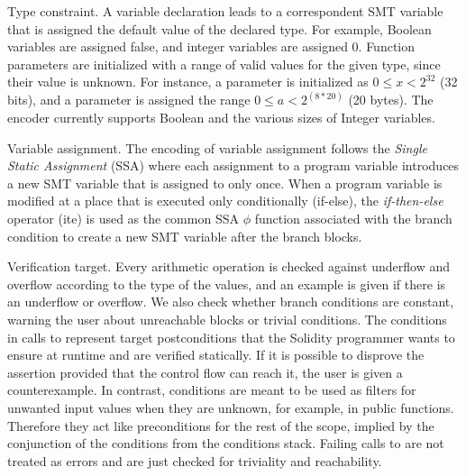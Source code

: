 \begin{paragraph}{Type constraint.}
A variable declaration leads to a correspondent SMT variable that is assigned
the default value of the declared type.
%
For example, Boolean variables are assigned false, and integer variables are
assigned 0.
%
Function parameters are initialized with a range of valid values for the given
type, since their value is unknown.  For instance, a parameter 
is initialized as $0 \le x < 2^{32}$ (32 bits), and a parameter  is assigned the range $0 \le a < 2^{(8*20)}$ (20 bytes).
%
The encoder currently supports Boolean and the various sizes of Integer
variables.

\end{paragraph}

\begin{paragraph}{Variable assignment.}
The encoding of variable assignment follows the \emph{Single Static Assignment}
(SSA) where each assignment to a program variable introduces a new SMT variable
that is assigned to only once.
%
When a program variable is modified at a place that is executed only
conditionally (if-else), the \emph{if-then-else} operator (ite) is used as the
common SSA $\phi$ function associated with the branch condition to create a new
SMT variable after the branch blocks.
\end{paragraph}

\begin{paragraph}{Verification target.}
Every arithmetic operation is checked against underflow and overflow according
to the type of the values, and an example is given if there is an underflow or
overflow.
%
We also check whether branch conditions are constant, warning the user about
unreachable blocks or trivial conditions.
%
The conditions in calls to  represent target postconditions that the
Solidity programmer wants to ensure at runtime and are verified statically.
%
If it is possible to disprove the assertion provided that the control flow
can reach it, the user is given a counterexample.
%
In contrast,  conditions are meant to be used as
filters for unwanted input values when they are unknown, for example, in public
functions.
%
Therefore they act like preconditions for the rest of the scope, implied by the
conjunction of the conditions from the conditions stack.
%
Failing calls to  are not treated as errors and
are just checked for triviality and reachability.
\end{paragraph}

